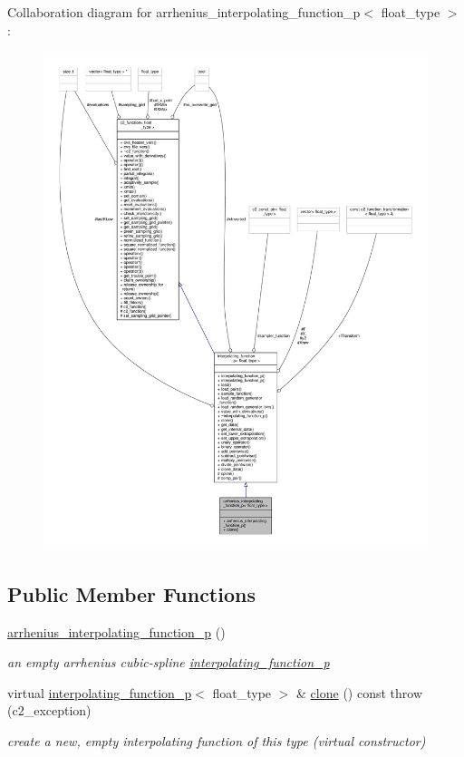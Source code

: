 Collaboration diagram for arrhenius\+\_\+interpolating\+\_\+function\+\_\+p$<$ float\+\_\+type $>$\+:
\nopagebreak
\begin{figure}[H]
\begin{center}
\leavevmode
\includegraphics[width=350pt]{classarrhenius__interpolating__function__p__coll__graph}
\end{center}
\end{figure}
\subsection*{Public Member Functions}
\begin{DoxyCompactItemize}
\item 
\hyperlink{classarrhenius__interpolating__function__p_ad0557b1774e14d7a310aa14bb64d6bc5}{arrhenius\+\_\+interpolating\+\_\+function\+\_\+p} ()
\begin{DoxyCompactList}\small\item\em an empty arrhenius cubic-\/spline \hyperlink{classinterpolating__function__p}{interpolating\+\_\+function\+\_\+p} \end{DoxyCompactList}\item 
virtual \hyperlink{classinterpolating__function__p}{interpolating\+\_\+function\+\_\+p}$<$ float\+\_\+type $>$ \& \hyperlink{classarrhenius__interpolating__function__p_aad3096d6df4488e4226036fb52298ffa}{clone} () const   throw (c2\+\_\+exception)
\begin{DoxyCompactList}\small\item\em create a new, empty interpolating function of this type (virtual constructor) \end{DoxyCompactList}\end{DoxyCompactItemize}
